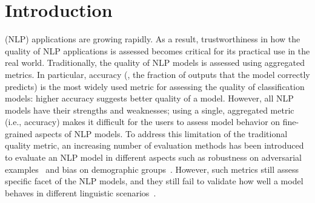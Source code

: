 \section{Introduction}
\label{sec:intro}



\Nlp (NLP) applications are growing rapidly.  As a result, trustworthiness in 
how the quality of NLP applications is assessed becomes critical for its 
practical use in the real world. Traditionally, the quality of NLP models is 
assessed using aggregated metrics. In particular, accuracy (\ie, the fraction of 
outputs that the model correctly predicts) is the most widely used metric for 
assessing the quality of classification models:
higher accuracy suggests better quality of a model. However, all NLP models have 
their strengths and weaknesses; using a single, aggregated metric (i.e., 
accuracy) makes it difficult for the users to assess model behavior on fine-grained aspects of NLP models. To address this limitation of the 
traditional quality metric, an increasing number of evaluation methods has been 
introduced to evaluate an NLP model in different aspects such as robustness on 
adversarial examples~\cite{morris2020textattack,zang2020sememepso,alzantot2018genadvexp,linyang2020bertattack,udeshi2019ogma} and bias on demographic groups~\cite{soremekun2020astraea,udeshi2018fairnesstest,asyrofi2022biasfinder,maIJCAI2020mtnlp}. However, such metrics still assess specific facet of the NLP models, and they still fail to validate how well a model behaves in different linguistic scenarios~\cite{geva2019we,gururangan2018annotation}. 


